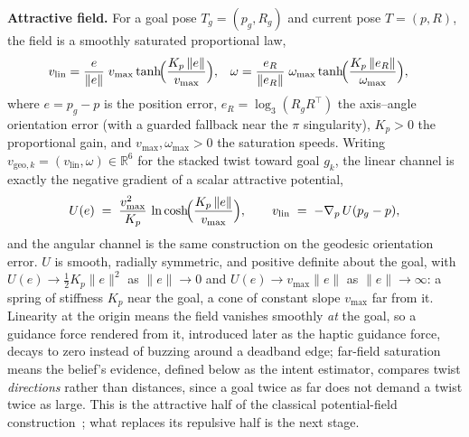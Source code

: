 \textbf{Attractive field.} For a goal pose $T_g = (p_g, R_g)$ and current pose $T = (p, R)$, the field is a smoothly saturated proportional law,
\begin{align}
v_{\text{lin}} &= \frac{e}{\|e\|}\; v_{\max}\tanh\!\Bigl(\frac{K_p\,\|e\|}{v_{\max}}\Bigr),
&
\omega &= \frac{e_R}{\|e_R\|}\; \omega_{\max}\tanh\!\Bigl(\frac{K_p\,\|e_R\|}{\omega_{\max}}\Bigr),
\label{eq:vgeo}
\end{align}
where $e = p_g - p$ is the position error, $e_R = \log_3(R_g R^{\top})$ the axis--angle orientation error (with a guarded fallback near the $\pi$ singularity), $K_p > 0$ the proportional gain, and $v_{\max}, \omega_{\max} > 0$ the saturation speeds. Writing $v_{\text{geo},k} = (v_{\text{lin}}, \omega) \in \mathbb{R}^6$ for the stacked twist toward goal $g_k$, the linear channel is exactly the negative gradient of a scalar attractive potential,
\begin{equation}
U(e) \;=\; \frac{v_{\max}^{2}}{K_p}\,\ln\cosh\!\Bigl(\frac{K_p\,\|e\|}{v_{\max}}\Bigr),
\qquad
v_{\text{lin}} \;=\; -\nabla_{p}\,U(p_g - p),
\label{eq:attpot}
\end{equation}
and the angular channel is the same construction on the geodesic orientation error. $U$ is smooth, radially symmetric, and positive definite about the goal, with $U(e) \to \tfrac{1}{2}K_p\|e\|^{2}$ as $\|e\| \to 0$ and $U(e) \to v_{\max}\|e\|$ as $\|e\| \to \infty$: a spring of stiffness $K_p$ near the goal, a cone of constant slope $v_{\max}$ far from it. Linearity at the origin means the field vanishes smoothly \emph{at} the goal, so a guidance force rendered from it, introduced later as the haptic guidance force, decays to zero instead of buzzing around a deadband edge; far-field saturation means the belief's evidence, defined below as the intent estimator, compares twist \emph{directions} rather than distances, since a goal twice as far does not demand a twist twice as large. This is the attractive half of the classical potential-field construction~\cite{khatib1986}; what replaces its repulsive half is the next stage.

